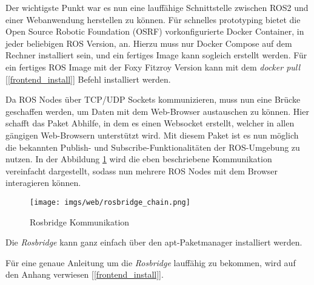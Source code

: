 \begin{flushleft}

Der wichtigste Punkt war es nun eine lauffähige Schnittstelle zwischen ROS2 und einer Webanwendung herstellen zu können.
Für schnelles prototyping bietet die Open Source Robotic Foundation (OSRF) vorkonfigurierte Docker Container, in jeder beliebigen ROS Version, an.
Hierzu muss nur Docker Compose auf dem Rechner installiert sein, und ein fertiges Image kann sogleich erstellt werden.
Für ein fertiges ROS Image mit der Foxy Fitzroy Version kann mit dem \textit{docker pull} [\ref{frontend_install}] Befehl installiert werden. 


Da ROS Nodes über TCP/UDP Sockets kommunizieren, muss nun eine Brücke geschaffen werden, um Daten mit dem Web-Browser austauschen zu können.
Hier schafft das \cite[Rosbridge]{rosbridgepackage} Paket Abhilfe, in dem es einen Websocket erstellt, welcher in allen gängigen Web-Browsern unterstützt wird. Mit diesem Paket ist es nun möglich die bekannten Publish- und Subscribe-Funktionalitäten der ROS-Umgebung zu nutzen.
In der Abbildung \ref{fig:rosbridge_chain} wird die eben beschriebene Kommunikation vereinfacht dargestellt, sodass nun mehrere ROS Nodes mit dem Browser interagieren können.
\begin{figure}[h!]
    \centering
    \texttt{[image: imgs/web/rosbridge\_chain.png]}
    \caption{Rosbridge Kommunikation \cite{foxyglove_rosbridge_tut}}
    \label{fig:rosbridge_chain}%
\end{figure}
Die \textit{Rosbridge} kann ganz einfach über den apt-Paketmanager installiert werden.



Für eine genaue Anleitung um die \textit{Rosbridge} lauffähig zu bekommen, wird auf den Anhang verwiesen [\ref{frontend_install}].


\end{flushleft}
